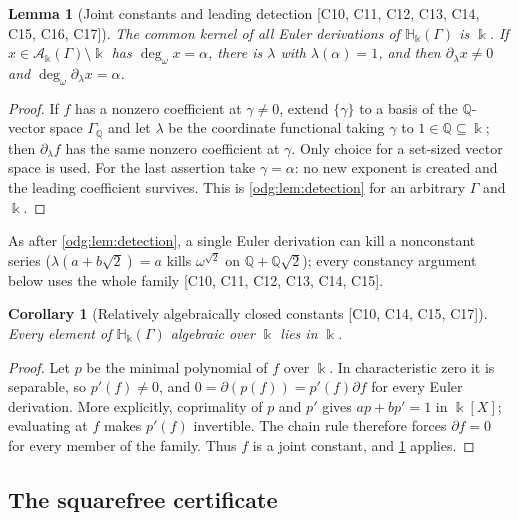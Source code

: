 \documentclass[11pt,oneside]{article}
\numberwithin{equation}{section}
\newtheorem{lemma}[lemma]{Lemma}
\newtheorem{corollary}[corollary]{Corollary}
\theoremstyle{definition}
\theoremstyle{remark}
\newcommand{\Q}{\mathbb Q}
\newcommand{\ddeg}{\operatorname{deg}_{\omega}}
\newcommand{\src}[1]{\textup{\textsf{\small[#1]}}}
\newcommand{\crH}{\mathbb H_\Bbbk(\Gamma)}
\newcommand{\crA}{\mathcal A_\Bbbk(\Gamma)}
\begin{document}
\begin{lemma}[Joint constants and leading detection \src{C10, C11, C12, C13, C14, C15, C16, C17}]\label{odg:cr:lem:separation}
The common kernel of all Euler derivations of $\crH$ is $\Bbbk$. If
$x\in\crA\setminus\Bbbk$ has $\ddeg x=\alpha$, there is $\lambda$ with
$\lambda(\alpha)=1$, and then $\partial_\lambda x\ne0$ and
$\ddeg\partial_\lambda x=\alpha$.
\end{lemma}
\begin{proof}
If $f$ has a nonzero coefficient at $\gamma\ne0$, extend $\{\gamma\}$ to a basis of
the $\Q$-vector space $\Gamma_\Q$ and let $\lambda$ be the coordinate functional
taking $\gamma$ to $1\in\Q\subseteq\Bbbk$; then $\partial_\lambda f$ has the same
nonzero coefficient at $\gamma$. Only choice for a set-sized vector space is used.
For the last assertion take $\gamma=\alpha$: no new exponent is created and the
leading coefficient survives. This is \cref{odg:lem:detection} for an arbitrary
$\Gamma$ and $\Bbbk$.
\end{proof}

As after \cref{odg:lem:detection}, a single Euler derivation can kill a
nonconstant series ($\lambda(a+b\sqrt2)=a$ kills $\omega^{\sqrt2}$ on
$\Q+\Q\sqrt2$); every constancy argument below uses the whole family
\src{C10, C11, C12, C13, C14, C15}.

\begin{corollary}[Relatively algebraically closed constants \src{C10, C14, C15, C17}]\label{odg:cr:cor:algclosed}
Every element of $\crH$ algebraic over $\Bbbk$ lies in $\Bbbk$.
\end{corollary}
\begin{proof}
Let $p$ be the minimal polynomial of $f$ over $\Bbbk$. In characteristic zero it
is separable, so $p'(f)\ne0$, and $0=\partial(p(f))=p'(f)\partial f$ for every
Euler derivation. More explicitly, coprimality of $p$ and $p'$ gives
$a p+b p'=1$ in $\Bbbk[X]$; evaluating at $f$ makes $p'(f)$ invertible.
The chain rule therefore forces $\partial f=0$ for every member of the
family. Thus $f$ is a joint constant, and
\cref{odg:cr:lem:separation} applies.
\end{proof}

\subsection{The squarefree certificate}\label{odg:cr:sub:squarefree}
\end{document}
